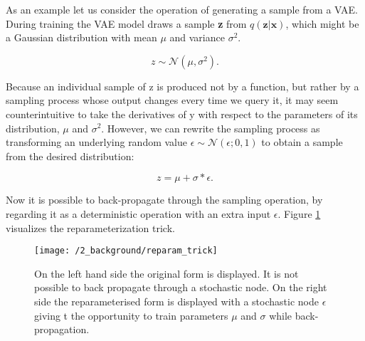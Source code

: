 As an example let us consider the operation of generating a sample from a VAE.
During training the VAE model draws a sample \textbf{z} from
$q(\textbf{z}|\textbf{x})$, which might be a Gaussian distribution with mean
$\mu$ and variance $\sigma^2$.

\begin{equation}
    z \sim \mathcal{N}(\mu, \sigma^2).
\end{equation}

Because an individual sample of z is produced not by a function, but rather by a
sampling process whose output changes every time we query it, it may seem
counterintuitive to take the derivatives of y with respect to the parameters of
its distribution, $\mu$ and $\sigma^2$. However, we can rewrite the sampling
process as transforming an underlying random value $\epsilon \sim
\mathcal{N}(\epsilon; 0, 1)$ to obtain a sample from the desired distribution:

\begin{equation}
    z = \mu + \sigma * \epsilon.
\end{equation}

Now it is possible to back-propagate through the sampling operation, by
regarding it as a deterministic operation with an extra input $\epsilon$.
Figure \ref{reparam_trick} visualizes the reparameterization trick.

\begin{figure}
	\centering
	\texttt{[image: /2\_background/reparam\_trick]}
    \caption{On the left hand side the original form is displayed. It is not
    possible to back propagate through a stochastic node. On the right side the
    reparameterised form is displayed with a stochastic node $\epsilon$ giving t
    the opportunity to train parameters $\mu$ and $\sigma$ while
    back-propagation.} 
	\label{reparam_trick}
\end{figure}
